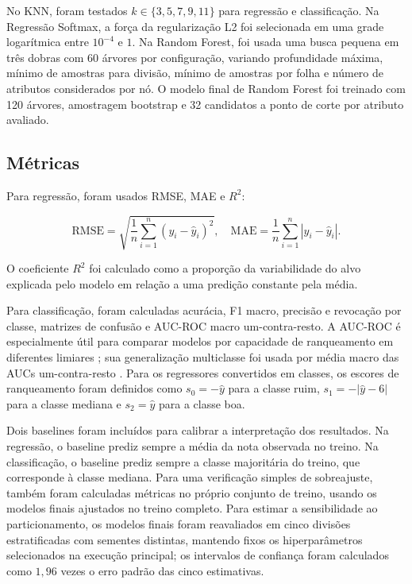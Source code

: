 \documentclass[12pt,a4paper]{article}
\begin{document}
No KNN, foram testados $k \in \{3,5,7,9,11\}$ para regress\~ao e classifica\c{c}\~ao. Na Regress\~ao Softmax, a for\c{c}a da regulariza\c{c}\~ao L2 foi selecionada em uma grade logar\'itmica entre $10^{-4}$ e $1$. Na Random Forest, foi usada uma busca pequena em tr\^es dobras com 60 \'arvores por configura\c{c}\~ao, variando profundidade m\'axima, m\'inimo de amostras para divis\~ao, m\'inimo de amostras por folha e n\'umero de atributos considerados por n\'o. O modelo final de Random Forest foi treinado com 120 \'arvores, amostragem bootstrap e 32 candidatos a ponto de corte por atributo avaliado.

\subsection{M\'etricas}
\label{subsec:metricas}

Para regress\~ao, foram usados RMSE, MAE e $R^2$:

\begin{equation}
\mathrm{RMSE} = \sqrt{\frac{1}{n}\sum_{i=1}^{n}(y_i-\hat{y}_i)^2},
\quad
\mathrm{MAE} = \frac{1}{n}\sum_{i=1}^{n}|y_i-\hat{y}_i|.
\end{equation}

O coeficiente $R^2$ foi calculado como a propor\c{c}\~ao da variabilidade do alvo explicada pelo modelo em rela\c{c}\~ao a uma predi\c{c}\~ao constante pela m\'edia.

Para classifica\c{c}\~ao, foram calculadas acur\'acia, F1 macro, precis\~ao e revoca\c{c}\~ao por classe, matrizes de confus\~ao e AUC-ROC macro um-contra-resto. A AUC-ROC \'e especialmente \'util para comparar modelos por capacidade de ranqueamento em diferentes limiares \cite{fawcett2006roc}; sua generaliza\c{c}\~ao multiclasse foi usada por m\'edia macro das AUCs um-contra-resto \cite{hand2001auc}. Para os regressores convertidos em classes, os escores de ranqueamento foram definidos como $s_0=-\hat{y}$ para a classe ruim, $s_1=-|\hat{y}-6|$ para a classe mediana e $s_2=\hat{y}$ para a classe boa.

Dois baselines foram inclu\'idos para calibrar a interpreta\c{c}\~ao dos resultados. Na regress\~ao, o baseline prediz sempre a m\'edia da nota observada no treino. Na classifica\c{c}\~ao, o baseline prediz sempre a classe majorit\'aria do treino, que corresponde \`a classe mediana. Para uma verifica\c{c}\~ao simples de sobreajuste, tamb\'em foram calculadas m\'etricas no pr\'oprio conjunto de treino, usando os modelos finais ajustados no treino completo. Para estimar a sensibilidade ao particionamento, os modelos finais foram reavaliados em cinco divis\~oes estratificadas com sementes distintas, mantendo fixos os hiperpar\^ametros selecionados na execu\c{c}\~ao principal; os intervalos de confian\c{c}a foram calculados como $1{,}96$ vezes o erro padr\~ao das cinco estimativas.
\end{document}
